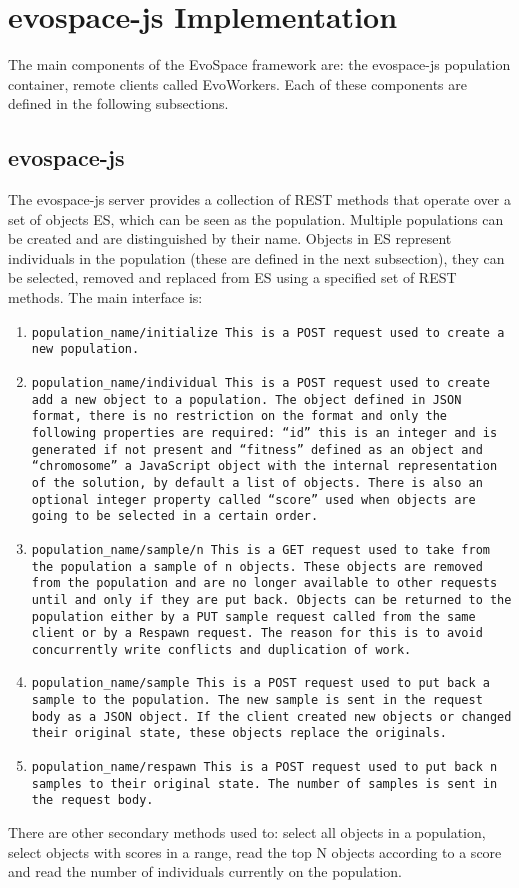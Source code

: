 \section{evospace-js Implementation}
\label{sec:evo}
The main components of the EvoSpace framework are: the evospace-js population container, 
remote clients called EvoWorkers. Each of these components are defined in the following subsections.

\subsection{evospace-js}
 \label{sec:evospace}
The evospace-js server provides a collection of REST methods that operate over a set of objects ES, 
which can be seen as the population. Multiple populations can be created and are distinguished by their name.
Objects in ES represent individuals in the population (these are defined in the next subsection), 
they can be selected, removed and replaced from ES using a specified set of REST methods. The main
interface is:
\begin{enumerate}
    \item  \tt {population_name/initialize} This is a POST request used to create a new population.
    \item \tt {population_name/individual} This is a POST request used to create add a new object
    to a population. The object defined in JSON format, there is no restriction on the format and only 
    the following properties are required: ``id'' this is an integer and is generated if not present 
    and ``fitness'' defined as an object and ``chromosome'' a JavaScript object with the internal 
    representation of the solution, by default a list of objects. 
    There is also an optional integer property called ``score'' used when objects are going to 
    be selected in a certain order.
    \item \tt {population_name/sample/n}  This is a GET request used to take from the population a 
    sample of \tt{n} objects. These objects are removed from the population and are no longer available
    to other requests until and only if they are put back. Objects can be returned to the population 
    either by a PUT sample request called from the same client or by a Respawn request. The reason for 
    this is to avoid concurrently write conflicts and duplication of work.
    \item \tt {population_name/sample}  This is a POST request used to put back a sample to the population.
    The new sample is sent in the request body as a JSON object. If the client created new objects or 
    changed their original state, these objects replace the originals. 
    \item \tt {population_name/respawn}  This is a POST request used to put back \tt {n} samples to their 
    original state. The number of samples is sent in the request body. 
\end{enumerate}
There are other secondary methods used to: select all objects in a population, select objects
with scores in a range, read the top N objects according to a score and read the number of
individuals currently on the population.      

